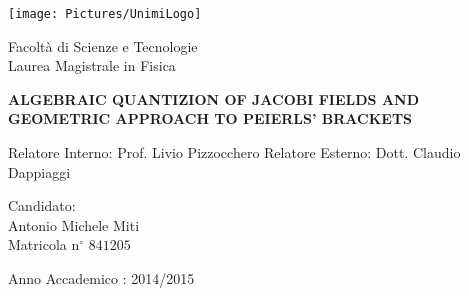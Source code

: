 \documentclass[
    pdftex,
    fontsize=11pt,
    a4paper
   ]{scrbook}
\begin{document}
\begin{titlepage}
{
\thispagestyle{empty}

\centerline{
\texttt{[image: Pictures/UnimiLogo]}
}

\begin{center}
{\Large Facoltà di Scienze e Tecnologie\\
\vskip0.2cm Laurea Magistrale in Fisica }
\end{center}


\vskip1.5cm
\begin{center}
{\huge \textbf{ALGEBRAIC QUANTIZION OF JACOBI FIELDS AND GEOMETRIC APPROACH TO PEIERLS' BRACKETS}}
\end{center}

{\large
\vskip20mm Relatore Interno:  Prof. Livio Pizzocchero 
\vskip1mm Relatore Esterno:  Dott. Claudio Dappiaggi
}

\vskip2cm
\hskip9cm\parbox[t]{7cm}
{\large 
	Candidato:\\
	\quad Antonio Michele Miti\\
	\quad Matricola n$^\circ$ $841205$\\
}
	\vfill
	\begin{center}
		Anno Accademico : 2014/2015
	\end{center}

\newpage
\newpage
\thispagestyle{empty}
\clearpage
}

\end{titlepage}
\end{document}
